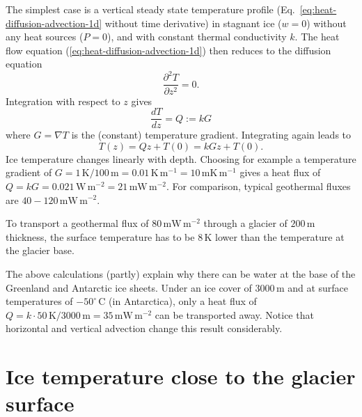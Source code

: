 \documentclass[parskip=half]{scrartcl}
\newcommand{\unit}[1]{\ensuremath{\,\mathrm{#1}}}
\newcommand{\cels}[1]{\ensuremath{#1^{\circ}\,\mathrm{C}}}
\begin{document}
The simplest case is a vertical steady state temperature profile
(Eq.~\ref{eq:heat-diffusion-advection-1d} without time derivative) in stagnant
ice ($w=0$) without any heat sources ($P=0$), and with constant thermal
conductivity $k$.  The heat flow equation
(\ref{eq:heat-diffusion-advection-1d}) then reduces to the diffusion equation
%
\begin{equation}
 \label{eq:diffusion-1d}
 \frac{\partial^2T}{\partial z^2} = 0.
\end{equation}
%
Integration with respect to $z$ gives
%
\begin{equation}
 \label{eq:diffusion-1d-1int}
 \frac{dT}{d z} = Q := k G
\end{equation}
%
where $G = \nabla T$ is the (constant) temperature gradient. Integrating again
leads to
%
\begin{equation}
 \label{eq:diffusion-1d-2int}
 T(z) = Q z + T(0) = kGz + T(0).
\end{equation}
%
Ice temperature changes linearly with depth.  Choosing for example a
temperature gradient of $G=1\unit{K}/ 100\unit{m} = 0.01\unit{K}\unit{m}^{-1}
= 10 \unit{mK}\unit{m}^{-1}$ gives a heat flux of $Q = kG = 0.021\unit{W}
\unit{m}^{-2} = 21\unit{mW} \unit{m}^{-2}$.  For comparison, typical
geothermal fluxes are $40- 120 \unit{mW} \unit{m}^{-2}$.

To transport a geothermal flux of $80 \unit{mW} \unit{m}^{-2}$ through a
glacier of $200\unit{m}$ thickness, the surface temperature has to be
$8\unit{K}$ lower than the temperature at the glacier base.

The above calculations (partly) explain why there can be water at the base of
the Greenland and Antarctic ice sheets.  Under an ice cover of $3000\unit{m}$
and at surface temperatures of \cels{-50} (in Antarctica), only a heat flux of
$Q=k \cdot 50\unit{K}/3000\unit{m}= 35\unit{mW}\unit{m}^{-2}$ can be
transported away.  Notice that horizontal and vertical advection change this
result considerably.


\section{Ice temperature close to the glacier surface}
\label{sec:ice-temp-surface}
\end{document}
